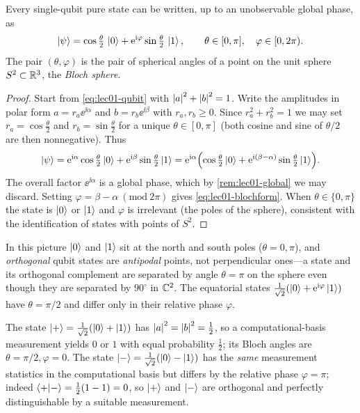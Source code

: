 \begin{proposition}\label{prop:lec01-bloch}
Every single-qubit pure state can be written, up to an unobservable global phase, as
\begin{equation}\label{eq:lec01-blochform}
  \ket{\psi}=\cos\tfrac{\theta}{2}\,\ket{0}+\mathrm{e}^{\mathrm{i}\varphi}\sin\tfrac{\theta}{2}\,\ket{1},
  \qquad \theta\in[0,\pi],\quad \varphi\in[0,2\pi).
\end{equation}
The pair $(\theta,\varphi)$ is the pair of spherical angles of a point on the unit
sphere $S^{2}\subset\mathbb{R}^{3}$, the \emph{Bloch sphere}.
\end{proposition}

\begin{proof}
Start from \eqref{eq:lec01-qubit} with $\left\lvert a \right\rvert^{2}+\left\lvert b \right\rvert^{2}=1$. Write the
amplitudes in polar form $a=r_a \ee^{\ii\alpha}$ and $b=r_b \ee^{\ii\beta}$ with
$r_a,r_b\ge0$. Since $r_a^{2}+r_b^{2}=1$ we may set $r_a=\cos\tfrac{\theta}{2}$ and
$r_b=\sin\tfrac{\theta}{2}$ for a unique $\theta\in[0,\pi]$ (both cosine and sine of
$\theta/2$ are then nonnegative). Thus
\[
  \ket{\psi}=\mathrm{e}^{\mathrm{i}\alpha}\cos\tfrac{\theta}{2}\ket{0}+\mathrm{e}^{\mathrm{i}\beta}\sin\tfrac{\theta}{2}\ket{1}
           =\mathrm{e}^{\mathrm{i}\alpha}\Bigl(\cos\tfrac{\theta}{2}\ket{0}+\mathrm{e}^{\mathrm{i}(\beta-\alpha)}\sin\tfrac{\theta}{2}\ket{1}\Bigr).
\]
The overall factor $\ee^{\ii\alpha}$ is a global phase, which by
\cref{rem:lec01-global} we may discard. Setting $\varphi=\beta-\alpha\ (\mathrm{mod}\ 2\pi)$
gives \eqref{eq:lec01-blochform}. When $\theta\in\{0,\pi\}$ the state is $\ket{0}$
or $\ket{1}$ and $\varphi$ is irrelevant (the poles of the sphere), consistent with
the identification of states with points of $S^{2}$.
\end{proof}

\begin{remark}
In this picture $\ket{0}$ and $\ket{1}$ sit at the north and south poles
($\theta=0,\pi$), and \emph{orthogonal} qubit states are \emph{antipodal} points,
not perpendicular ones---a state and its orthogonal complement are separated by
angle $\theta=\pi$ on the sphere even though they are separated by $90^{\circ}$ in
$\mathbb{C}^{2}$. The equatorial states $\tfrac{1}{\sqrt2}(\ket{0}+\mathrm{e}^{\mathrm{i}\varphi}\ket{1})$
have $\theta=\pi/2$ and differ only in their relative phase $\varphi$.
\end{remark}

\begin{example}\label{ex:lec01-pm}
The state $\ket{+}=\tfrac{1}{\sqrt2}(\ket{0}+\ket{1})$ has
$\left\lvert a \right\rvert^{2}=\left\lvert b \right\rvert^{2}=\tfrac12$, so a computational-basis measurement yields $0$
or $1$ with equal probability $\tfrac12$; its Bloch angles are $\theta=\pi/2,\varphi=0$.
The state $\ket{-}=\tfrac{1}{\sqrt2}(\ket{0}-\ket{1})$ has the \emph{same} measurement
statistics in the computational basis but differs by the relative phase
$\varphi=\pi$; indeed $\braket{+|-}=\tfrac12(1-1)=0$, so $\ket{+}$ and $\ket{-}$ are
orthogonal and perfectly distinguishable by a suitable measurement.
\end{example}

